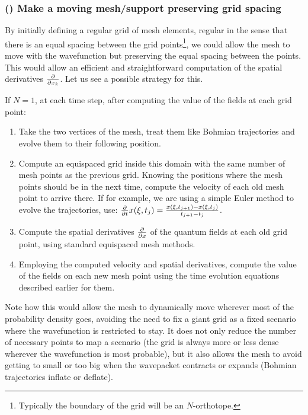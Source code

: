 \documentclass[11pt, a4paper]{article} %
\begin{document}
\subsubsection*{\bf (\textbeta) Make a moving mesh/support preserving grid spacing}\vspace{-0.2cm}
By initially defining a regular grid of mesh elements, regular in the sense that there is an equal spacing between the grid points\footnote{Typically the boundary of the grid will be an $N$-orthotope.}, we could allow the mesh to move with the wavefunction but preserving the equal spacing between the points. This would allow an efficient and straightforward computation of the spatial derivatives $\pdv{}{x_k}$. Let us see a possible strategy for this. 

If $N=1$, at each time step, after computing the value of the fields at each grid point:
\begin{enumerate}
\item Take the two vertices of the mesh, treat them like Bohmian trajectories and evolve them to their following position.
\item Compute an equispaced grid inside this domain with the same number of mesh points as the previous grid. Knowing the positions where the mesh points should be in the next time, compute the velocity of each old mesh point to arrive there. If for example, we are using a simple Euler method to evolve the trajectories, use: $\pdv{}{t}x(\xi,t_{j})=\frac{x(\xi,t_{j+1})-x(\xi,t_{j})}{t_{j+1}-t_j}$.
\item Compute the spatial derivatives $\pdv{}{x}$ of the quantum fields at each old grid point, using standard equispaced mesh methods.
\item Employing the computed velocity and spatial derivatives, compute the value of the fields on each new mesh point using the time evolution equations described earlier for them.
\end{enumerate}
Note how this would allow the mesh to dynamically move wherever most of the probability density goes, avoiding the need to fix a giant grid as a fixed scenario where the wavefunction is restricted to stay. It does not only reduce the number of necessary points to map a scenario (the grid is always more or less dense wherever the wavefunction is most probable), but it also allows the mesh to avoid getting to small or too big when the wavepacket contracts or expands (Bohmian trajectories inflate or deflate). 
 
\end{document}
